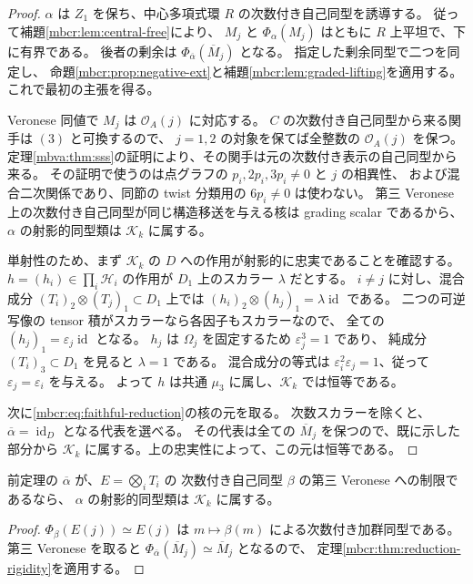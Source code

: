 \begin{proof}
$\alpha$ は $Z_1$ を保ち、中心多項式環 $R$ の次数付き自己同型を誘導する。
従って補題\ref{mbcr:lem:central-free}により、
$M_j$ と $\Phi_\alpha(M_j)$ はともに $R$ 上平坦で、下に有界である。
後者の剰余は $\Phi_{\overline\alpha}(\overline M_j)$ となる。
指定した剰余同型で二つを同定し、
命題\ref{mbcr:prop:negative-ext}と補題\ref{mbcr:lem:graded-lifting}を適用する。
これで最初の主張を得る。

Veronese 同値で $M_j$ は $\mathcal O_A(j)$ に対応する。
$C$ の次数付き自己同型から来る関手は $(3)$ と可換するので、
$j=1,2$ の対象を保てば全整数の $\mathcal O_A(j)$ を保つ。
定理\ref{mbva:thm:sss}の証明により、その関手は元の次数付き表示の自己同型から来る。
その証明で使うのは点グラフの $p_i,2p_i,3p_i\ne0$ と $j$ の相異性、
および混合二次関係であり、同節の twist 分類用の $6p_i\ne0$ は使わない。
第三 Veronese 上の次数付き自己同型が同じ構造移送を与える核は
grading scalar であるから、$\alpha$ の射影的同型類は $\mathcal K_k$ に属する。

単射性のため、まず $\mathcal K_k$ の $D$ への作用が射影的に忠実であることを確認する。
$h=(h_i)\in\prod_i\mathcal H_i$ の作用が $D_1$ 上のスカラー $\lambda$ だとする。
$i\ne j$ に対し、混合成分
$(T_i)_2\otimes(T_j)_1\subset D_1$ 上では
$(h_i)_2\otimes(h_j)_1=\lambda\operatorname{id}$ である。
二つの可逆写像の tensor 積がスカラーなら各因子もスカラーなので、
全ての $(h_j)_1=\varepsilon_j\operatorname{id}$ となる。
$h_j$ は $\Omega_j$ を固定するため $\varepsilon_j^3=1$ であり、
純成分 $(T_i)_3\subset D_1$ を見ると $\lambda=1$ である。
混合成分の等式は
$\varepsilon_i^2\varepsilon_j=1$、従って $\varepsilon_j=\varepsilon_i$ を与える。
よって $h$ は共通 $\mu_3$ に属し、$\mathcal K_k$ では恒等である。

次に\eqref{mbcr:eq:faithful-reduction}の核の元を取る。
次数スカラーを除くと、$\overline\alpha=\operatorname{id}_D$ となる代表を選べる。
その代表は全ての $\overline M_j$ を保つので、既に示した部分から
$\mathcal K_k$ に属する。上の忠実性によって、この元は恒等である。
\end{proof}

\begin{corollary}[次数一代数への持上げを持つ還元]
\label{mbcr:cor:reduction-lifts}
前定理の $\overline\alpha$ が、$E=\bigotimes_iT_i$ の
次数付き自己同型 $\beta$ の第三 Veronese への制限であるなら、
$\alpha$ の射影的同型類は $\mathcal K_k$ に属する。
\end{corollary}
\begin{proof}
$\Phi_\beta(E(j))\simeq E(j)$ は
$m\mapsto\beta(m)$ による次数付き加群同型である。
第三 Veronese を取ると
$\Phi_{\overline\alpha}(\overline M_j)\simeq\overline M_j$ となるので、
定理\ref{mbcr:thm:reduction-rigidity}を適用する。
\end{proof}

